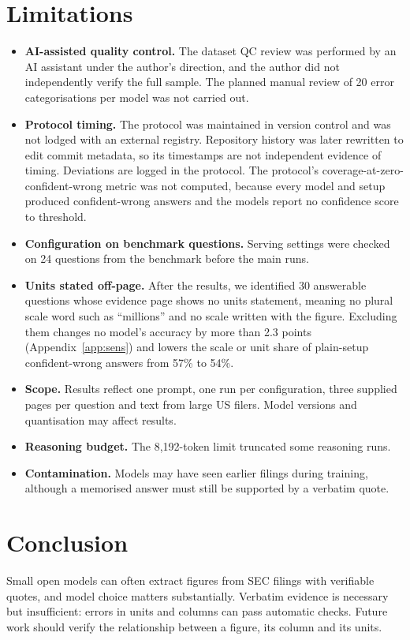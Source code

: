 \documentclass[11pt]{article}
\begin{document}
\section{Limitations}\label{sec:limits}
\begin{itemize}
\item \textbf{AI-assisted quality control.} The dataset QC review was performed by an AI assistant under the author's direction, and the author did not independently verify the full sample. The planned manual review of 20 error categorisations per model was not carried out.
\item \textbf{Protocol timing.} The protocol was maintained in version control and was not lodged with an external registry. Repository history was later rewritten to edit commit metadata, so its timestamps are not independent evidence of timing. Deviations are logged in the protocol. The protocol's coverage-at-zero-confident-wrong metric was not computed, because every model and setup produced confident-wrong answers and the models report no confidence score to threshold.
\item \textbf{Configuration on benchmark questions.} Serving settings were checked on 24 questions from the benchmark before the main runs.
\item \textbf{Units stated off-page.} After the results, we identified 30 answerable questions whose evidence page shows no units statement, meaning no plural scale word such as ``millions'' and no scale written with the figure. Excluding them changes no model's accuracy by more than 2.3 points (Appendix~\ref{app:sens}) and lowers the scale or unit share of plain-setup confident-wrong answers from 57\% to 54\%.
\item \textbf{Scope.} Results reflect one prompt, one run per configuration, three supplied pages per question and text from large US filers. Model versions and quantisation may affect results.
\item \textbf{Reasoning budget.} The 8,192-token limit truncated some reasoning runs.
\item \textbf{Contamination.} Models may have seen earlier filings during training, although a memorised answer must still be supported by a verbatim quote.
\end{itemize}

\section{Conclusion}
Small open models can often extract figures from SEC filings with verifiable quotes, and model choice matters substantially. Verbatim evidence is necessary but insufficient: errors in units and columns can pass automatic checks. Future work should verify the relationship between a figure, its column and its units.
\end{document}

